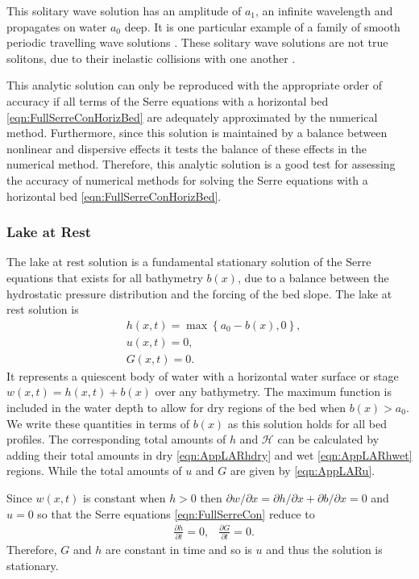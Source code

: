 This solitary wave solution has an amplitude of $a_1$, an infinite wavelength and propagates on water $a_0$ deep. It is one particular example of a family of smooth periodic travelling wave solutions \cite{El-etal-2006}. These solitary wave solutions are not true solitons, due to their inelastic collisions with one another \cite{Dutykh-etal-2013-761}. 

This analytic solution can only be reproduced with the appropriate order of accuracy if all terms of the Serre equations with a horizontal bed \eqref{eqn:FullSerreConHorizBed} are adequately approximated by the numerical method. Furthermore, since this solution is maintained by a balance between nonlinear and dispersive effects it tests the balance of these effects in the numerical method. Therefore, this analytic solution is a good test for assessing the accuracy of numerical methods for solving the Serre equations with a horizontal bed \eqref{eqn:FullSerreConHorizBed}.

\subsubsection{Lake at Rest}
The lake at rest solution is a fundamental stationary solution of the Serre equations that exists for all bathymetry $b(x)$, due to a balance between the hydrostatic pressure distribution and the forcing of the bed slope. The lake at rest solution is
\begin{subequations}
	\begin{align}
	&h(x,t) = \max\left\lbrace a_0 - b(x), 0 \right\rbrace, \\
	&u(x,t) = 0 , \\
	&G(x,t) = 0 .
	\end{align}
	\label{eqn:LARdefhub}
\end{subequations}
It represents a quiescent body of water with a horizontal water surface or stage $w(x,t) = h(x,t) + b(x)$ over any bathymetry. The maximum function is included in the water depth to allow for dry regions of the bed when $b(x) > a_0$. We write these quantities in terms of $b(x)$ as this solution holds for all bed profiles. The corresponding total amounts of $h$ and $\mathcal{H}$ can be calculated by adding their total amounts in dry \eqref{eqn:AppLARhdry} and wet \eqref{eqn:AppLARhwet} regions. While the total amounts of $u$ and $G$ are given by \eqref{eqn:AppLARu}. 

Since $w(x,t)$ is constant when $h> 0$ then $\partial w / \partial x = \partial h / \partial x + \partial b / \partial x = 0 $ and $u=0$ so that the Serre equations \eqref{eqn:FullSerreCon} reduce to
\begin{align*}
& \frac{\partial h}{\partial t}  = 0,  &\frac{\partial G}{\partial t}  = 0.
\end{align*}
Therefore, $G$ and $h$ are constant in time and so is $u$ and thus the solution is stationary.

